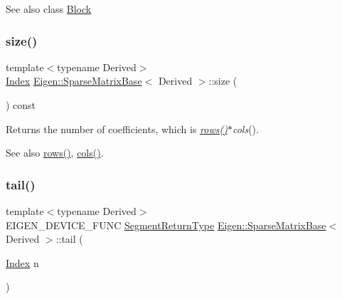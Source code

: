 \begin{DoxySeeAlso}{See also}
class \mbox{\hyperlink{class_eigen_1_1_block}{Block}} 
\end{DoxySeeAlso}
\mbox{\label{class_eigen_1_1_sparse_matrix_base_a124bc57921775eb9aa2dfd9727e23472}} 
\subsubsection{\texorpdfstring{size()}{size()}}
{\footnotesize\ttfamily template$<$typename Derived$>$ \\
\mbox{\hyperlink{struct_eigen_1_1_eigen_base_a554f30542cc2316add4b1ea0a492ff02}{Index}} \mbox{\hyperlink{class_eigen_1_1_sparse_matrix_base}{Eigen\+::\+Sparse\+Matrix\+Base}}$<$ Derived $>$\+::size (\begin{DoxyParamCaption}{ }\end{DoxyParamCaption}) const\hspace{0.3cm}{\ttfamily [inline]}}

\begin{DoxyReturn}{Returns}
the number of coefficients, which is {\itshape \mbox{\hyperlink{class_eigen_1_1_sparse_matrix_base_a1944e9fa9ce7937bfc3a87b2cb94371f}{rows()}}$\ast$cols}(). 
\end{DoxyReturn}
\begin{DoxySeeAlso}{See also}
\mbox{\hyperlink{class_eigen_1_1_sparse_matrix_base_a1944e9fa9ce7937bfc3a87b2cb94371f}{rows()}}, \mbox{\hyperlink{class_eigen_1_1_sparse_matrix_base_aca7ce296424ef6e478ab0fb19547a7ee}{cols()}}. 
\end{DoxySeeAlso}
\mbox{\label{class_eigen_1_1_sparse_matrix_base_a381e2efeb1531223bbb318b1ac5c5090}} 
\subsubsection{\texorpdfstring{tail()}{tail()}\hspace{0.1cm}{\footnotesize\ttfamily [1/2]}}
{\footnotesize\ttfamily template$<$typename Derived$>$ \\
E\+I\+G\+E\+N\+\_\+\+D\+E\+V\+I\+C\+E\+\_\+\+F\+U\+NC \mbox{\hyperlink{class_eigen_1_1_vector_block}{Segment\+Return\+Type}} \mbox{\hyperlink{class_eigen_1_1_sparse_matrix_base}{Eigen\+::\+Sparse\+Matrix\+Base}}$<$ Derived $>$\+::tail (\begin{DoxyParamCaption}\item[{\mbox{\hyperlink{struct_eigen_1_1_eigen_base_a554f30542cc2316add4b1ea0a492ff02}{Index}}}]{n }\end{DoxyParamCaption})\hspace{0.3cm}{\ttfamily [inline]}}

